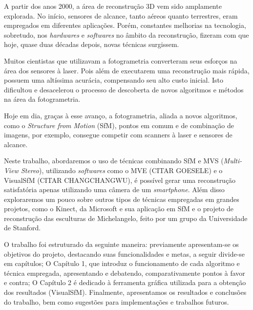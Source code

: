 \documentclass[a4paper,12pt,oneside,onecolumn,final,fleqn]{repUERJ}
\theoremstyle{plain}
\theoremstyle{definition}
\begin{document}
A partir dos anos 2000, a área de reconstrução 3D vem sido amplamente explorada. No início, sensores de alcance, tanto aéreos quanto terrestres, eram empregados em diferentes aplicações. Porém, constantes melhorias na tecnologia, sobretudo, nos {\it hardwares} e {\it softwares} no âmbito da reconstrução, fizeram com que hoje, quase duas décadas depois, novas técnicas surgissem.

Muitos cientistas que utilizavam a fotogrametria converteram seus esforços na área dos sensores à laser. Pois além de executarem uma reconstrução mais rápida, possuem uma altíssima acurácia, compensando seu alto custo inicial. Isto dificultou e desacelerou o processo de descoberta de novos algoritmos e métodos na área da fotogrametria. 

Hoje em dia, graças à esse avanço, a fotogrametria, aliada a novos algoritmos, como o {\it Structure from Motion} (SfM), pontos em comum e de combinação de imagens, por exemplo, consegue competir com scanners à laser e sensores de alcance. 

Neste trabalho, abordaremos o uso de técnicas combinando SfM e MVS ({\it Multi-View Stereo}), utilizando {\it softwares} como o MVE (CITAR GOESELE) e o VisualSfM (CITAR CHANGCHANGWU), é possível gerar uma reconstrução satisfatória apenas utilizando uma câmera de um {\it smartphone}. Além disso exploraremos um pouco sobre outros tipos de técnicas empregadas em grandes projetos, como o Kinect, da Microsoft e sua aplicação em SfM e o projeto de reconstrução das esculturas de Michelangelo, feito por um grupo da Universidade de Stanford.


O trabalho foi estruturado da seguinte maneira: previamente apresentam-se os objetivos do projeto, destacando suas funcionalidades e metas, a seguir divide-se em capítulos; O Capítulo 1, que introduz o funcionamento de cada algoritmo e técnica empregada, apresentando e debatendo, comparativamente pontos à favor e contra; O Capítulo 2 é dedicado à ferramenta gráfica utilizada para a obtenção dos resultados (VisualSfM). Finalmente, apresentamos os resultados e conclusões do trabalho, bem como sugestões para implementações e trabalhos futuros.



\imprimirchaves


\end{document}
